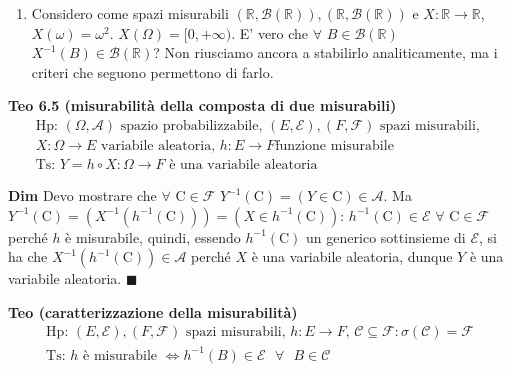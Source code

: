 \documentclass{article}
\begin{document}
\begin{enumerate}
\item Considero come spazi misurabili $\left( 
\mathbb{R}
,\mathcal{B}\left( 
\mathbb{R}
\right) \right) ,\left( 
\mathbb{R}
,\mathcal{B}\left( 
\mathbb{R}
\right) \right) $ e $X:%
\mathbb{R}
\rightarrow 
\mathbb{R}
$, $X\left( \omega \right) =\omega ^{2}$. $X\left( \Omega \right)
=[0,+\infty )$. E' vero che $\forall $ $B\in \mathcal{B}\left( 
\mathbb{R}
\right) $ $X^{-1}\left( B\right) \in \mathcal{B}\left( 
\mathbb{R}
\right) $? Non riusciamo ancora a stabilirlo analiticamente, ma i criteri
che seguono permettono di farlo.
\end{enumerate}

\textbf{Teo 6.5 (misurabilit\`{a} della composta di due misurabili)}%
\begin{gather*}
\text{Hp}\text{: }\left( \Omega ,\mathcal{A}\right) \text{ spazio
probabilizzabile, }\left( E,\mathcal{E}\right) ,\left( F,\mathcal{F}\right) 
\text{ spazi misurabili, } \\
X:\Omega \rightarrow E\text{ variabile aleatoria, }h:E\rightarrow F\text{
funzione misurabile} \\
\text{Ts}\text{: }Y=h\circ X:\Omega \rightarrow F\text{ \`{e} una variabile
aleatoria}
\end{gather*}

\textbf{Dim} Devo mostrare che $\forall $ $\mathrm{C}\in \mathcal{F}$ $%
Y^{-1}\left( \mathrm{C}\right) =\left( Y\in \mathrm{C}\right) \in \mathcal{A}
$. Ma $Y^{-1}\left( \mathrm{C}\right) =\left( X^{-1}\left( h^{-1}\left( 
\mathrm{C}\right) \right) \right) =\left( X\in h^{-1}\left( \mathrm{C}%
\right) \right) $: $h^{-1}\left( \mathrm{C}\right) \in \mathcal{E}$ $\forall 
$ $\mathrm{C}\in \mathcal{F}$ perch\'{e} $h$ \`{e} misurabile, quindi,
essendo $h^{-1}\left( \mathrm{C}\right) $ un generico sottinsieme di $%
\mathcal{E}$, si ha che $X^{-1}\left( h^{-1}\left( \mathrm{C}\right) \right)
\in \mathcal{A}$ perch\'{e} $X$ \`{e} una variabile aleatoria, dunque $Y$ 
\`{e} una variabile aleatoria. $\blacksquare $

\textbf{Teo (caratterizzazione della misurabilit\`{a}) }%
\begin{gather*}
\text{Hp}\text{: }\left( E,\mathcal{E}\right) ,\left( F,\mathcal{F}\right) 
\text{ spazi misurabili, }h:E\rightarrow F\text{, }\mathcal{C}\subseteq 
\mathcal{F}:\sigma \left( \mathcal{C}\right) =\mathcal{F} \\
\text{Ts}\text{: }h\text{ \`{e} misurabile }\Longleftrightarrow h^{-1}\left(
B\right) \in \mathcal{E}\text{ }\forall \text{ }B\in \mathcal{C}
\end{gather*}
\end{document}
